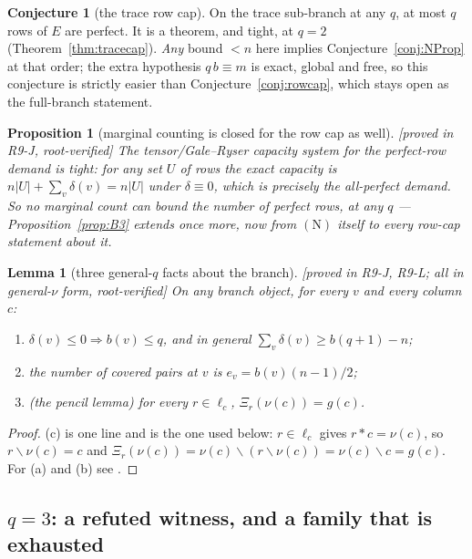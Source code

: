 \documentclass[11pt]{article}
\theoremstyle{plain}
\newtheorem{lemma}[theorem]{Lemma}
\newtheorem{proposition}[theorem]{Proposition}
\theoremstyle{definition}
\newtheorem{conjecture}[theorem]{Conjecture}
\theoremstyle{remark}
\numberwithin{equation}{section}
\newcommand{\op}{\mathbin{*}}
\newcommand{\statusbox}[1]{{\small\sloppy\textsf{[#1]}}}
\newcommand{\PROVED}[1]{\statusbox{proved in #1, root-verified}}
\begin{document}
\begin{conjecture}[the trace row cap]\label{conj:tracerowcap}
On the trace sub-branch at any $q$, at most $q$ rows of $E$ are perfect. It is a
theorem, and tight, at $q = 2$ (Theorem~\ref{thm:tracecap}). \emph{Any} bound
$<n$ here implies Conjecture~\ref{conj:NProp} at that order; the extra hypothesis
$q\,b\equiv m$ is exact, global and free, so this conjecture is strictly easier
than Conjecture~\ref{conj:rowcap}, which stays open as the full-branch statement.
\end{conjecture}

\begin{proposition}[marginal counting is closed for the row cap as
well]\label{prop:marginalvacuity}
\PROVED{R9-J}
The tensor/Gale--Ryser capacity system for the perfect-row demand is \emph{tight}:
for any set $U$ of rows the exact capacity is
$n|U| + \sum_{v}\delta(v) = n|U|$ under $\delta\equiv0$, which is precisely the
all-perfect demand. So no marginal count can bound the number of perfect rows, at
any $q$ --- Proposition~\ref{prop:B3} extends once more, now from $(\mathrm{N})$
itself to every row-cap statement about it.
\end{proposition}

\begin{lemma}[three general-$q$ facts about the branch]\label{lem:branchfacts}
\PROVED{R9-J, R9-L; all in general-$\nu$ form}
On any branch object, for every $v$ and every column $c$:
\begin{enumerate}
\item[(a)] $\delta(v)\le0\Rightarrow b(v)\le q$, and in general
$\sum_v\delta(v)\ge b(q+1)-n$;
\item[(b)] the number of covered pairs at $v$ is $e_v = b(v)(n-1)/2$;
\item[(c)] \emph{(the pencil lemma)} for every $r\in\ell_c$,
$\Xi_r(\nu(c)) = g(c)$.
\end{enumerate}
\end{lemma}

\begin{proof}
(c) is one line and is the one used below: $r\in\ell_c$ gives $r\op c = \nu(c)$,
so $r\backslash\nu(c) = c$ and
$\Xi_r(\nu(c)) = \nu(c)\backslash(r\backslash\nu(c)) = \nu(c)\backslash c = g(c)$.
For (a) and (b) see \cite{R9J}.
\end{proof}

\subsection{$q = 3$: a refuted witness, and a family that is exhausted}\label{sec:q3}
\end{document}
